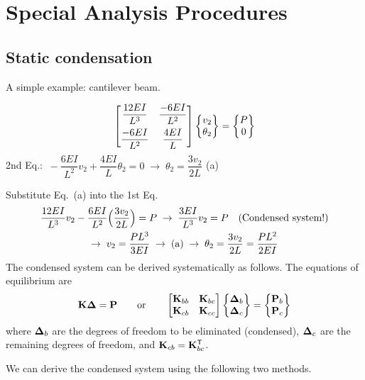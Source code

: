 \chapter{Special Analysis Procedures}
\label{ch:special}

\section{Static condensation}
A simple example: cantilever beam.
\begin{fig}
  
\end{fig}
\begin{equation*}
  \begin{bmatrix}\dfrac{12EI}{L^3} & \dfrac{-6EI}{L^2}\\[8pt] \dfrac{-6EI}{L^2} & \dfrac{4EI}{L}\end{bmatrix}\begin{Bmatrix}v_2\\ \theta_2\end{Bmatrix} = \begin{Bmatrix}P\\ 0\end{Bmatrix}
\end{equation*}
2nd Eq.: $\ -\dfrac{6EI}{L^2}v_2 + \dfrac{4EI}{L}\theta_2 = 0 \;\rightarrow\; \theta_2 = \dfrac{3v_2}{2L}$ \hfill (a)

Substitute Eq.~(a) into the 1st Eq.
\begin{gather*}
  \frac{12EI}{L^3}v_2 - \frac{6EI}{L^2}\Bigl(\frac{3v_2}{2L}\Bigr) = P \;\rightarrow\; \frac{3EI}{L^3}v_2 = P\quad\text{(Condensed system!)}\\
  \rightarrow\; v_2 = \frac{PL^3}{3EI} \;\rightarrow\; \text{(a)} \;\rightarrow\; \theta_2 = \frac{3v_2}{2L} = \frac{PL^2}{2EI}
\end{gather*}
The condensed system can be derived systematically as follows. The equations of equilibrium are
\begin{equation}
  \mathbf{K}\bm{\Delta} = \mathbf{P}\qquad\text{or}\qquad
  \begin{bmatrix}\mathbf{K}_{bb} & \mathbf{K}_{bc}\\ \mathbf{K}_{cb} & \mathbf{K}_{cc}\end{bmatrix}\begin{Bmatrix}\bm{\Delta}_b\\ \bm{\Delta}_c\end{Bmatrix} = \begin{Bmatrix}\mathbf{P}_b\\ \mathbf{P}_c\end{Bmatrix}
\end{equation}
where $\bm{\Delta}_b$ are the degrees of freedom to be eliminated (condensed), $\bm{\Delta}_c$ are the remaining degrees of freedom, and $\mathbf{K}_{cb} = \mathbf{K}_{bc}^{\mathsf{T}}$.

We can derive the condensed system using the following two methods.

